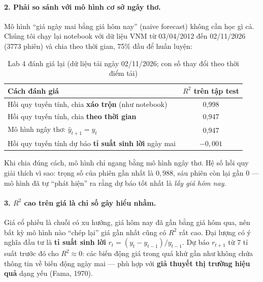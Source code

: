 \paragraph{2. Phải so sánh với mô hình cơ sở ngây thơ.} Mô hình ``giá ngày mai bằng giá hôm nay'' (naive forecast) không cần học gì cả. Chúng tôi chạy lại notebook với dữ liệu VNM từ 03/04/2012 đến 02/11/2026 (3773 phiên) và chia theo thời gian, 75\% đầu để huấn luyện:

\begin{table}[H]
\centering
\begin{tabular}{|l|c|}
\hline
\textbf{Cách đánh giá} & \textbf{$R^2$ trên tập test} \\
\hline
Hồi quy tuyến tính, chia \textbf{xáo trộn} (như notebook) & 0,998 \\ \hline
Hồi quy tuyến tính, chia \textbf{theo thời gian} & 0,947 \\ \hline
Mô hình ngây thơ: $\hat{y}_{t+1} = y_t$ & 0,947 \\ \hline
Hồi quy tuyến tính dự báo \textbf{tỉ suất sinh lời} ngày mai & $-0{,}001$ \\ \hline
\end{tabular}
\caption{Lab 4 đánh giá lại (dữ liệu tải ngày 02/11/2026; con số thay đổi theo thời điểm tải)}
\label{tab:lab-vnm}
\end{table}

Khi chia đúng cách, mô hình chỉ ngang bằng mô hình ngây thơ. Hệ số hồi quy giải thích vì sao: trọng số của phiên gần nhất là $0{,}988$, sáu phiên còn lại gần 0 --- mô hình đã tự ``phát hiện'' ra rằng dự báo tốt nhất là \textit{lấy giá hôm nay}.

\paragraph{3. $R^2$ cao trên giá là chỉ số gây hiểu nhầm.} Giá cổ phiếu là chuỗi có xu hướng, giá hôm nay đã gần bằng giá hôm qua, nên bất kỳ mô hình nào ``chép lại'' giá gần nhất cũng có $R^2$ rất cao. Đại lượng có ý nghĩa đầu tư là \textbf{tỉ suất sinh lời} $r_t = (y_t - y_{t-1})/y_{t-1}$. Dự báo $r_{t+1}$ từ 7 tỉ suất trước đó cho $R^2 \approx 0$: các biến động giá trong quá khứ gần như không chứa thông tin về biến động ngày mai --- phù hợp với \textbf{giả thuyết thị trường hiệu quả} dạng yếu (Fama, 1970).

